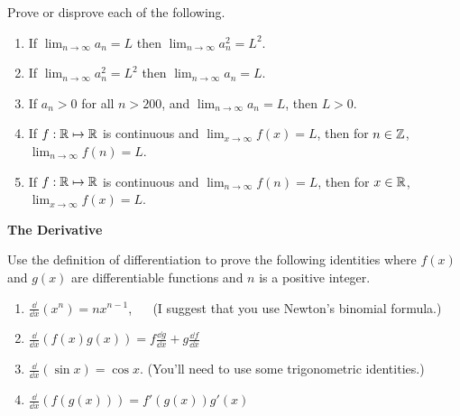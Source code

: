 \begin{Exercise}
  \label{exercise lim a = L lim a2 = L2}
  Prove or disprove each of the following.
  \begin{enumerate}
  \item 
    If $\lim_{n \to \infty} a_n = L$ then $\lim_{n \to \infty} a_n^2 = L^2$.
  \item 
    If $\lim_{n \to \infty} a_n^2 = L^2$ then $\lim_{n \to \infty} a_n = L$.
  \item 
    If $a_n > 0$ for all $n > 200$, and $\lim_{n \to \infty} a_n = L$, then $L > 0$.
  \item 
    If $f : \mathbb{R} \mapsto \mathbb{R}$ is continuous and $\lim_{x \to \infty} f(x) = L$, then for 
    $n \in \mathbb{Z}$, $\lim_{n \to \infty} f(n) = L$.
  \item 
    If $f : \mathbb{R} \mapsto \mathbb{R}$ is continuous and $\lim_{n \to \infty} f(n) = L$, then for 
    $x \in \mathbb{R}$, $\lim_{x \to \infty} f(x) = L$.
  \end{enumerate}

\end{Exercise}







\begin{large}
  \noindent
  \textbf{The Derivative}
\end{large}





\begin{Exercise}
  \label{exercise differentiation properties}
  Use the definition of differentiation to prove the following identities
  where $f(x)$ and $g(x)$ are differentiable functions and $n$ is a positive 
  integer.
  \begin{enumerate}
  \item
    $\frac{\dd}{\dd x} (x^n) = n x^{n-1}$, $\quad$ (I suggest that you use Newton's
    binomial formula.)
  \item
    $\frac{\dd}{\dd x} (f(x) g(x)) = f \frac{\dd g}{\dd x} 
    + g \frac{\dd f}{\dd x}$
  \item
    $\frac{\dd}{\dd x} (\sin x) = \cos x$.  (You'll need to use some 
    trigonometric identities.)
  \item
    $\frac{\dd}{\dd x} (f(g(x))) = f'(g(x)) g'(x)$
  \end{enumerate}

\end{Exercise}





